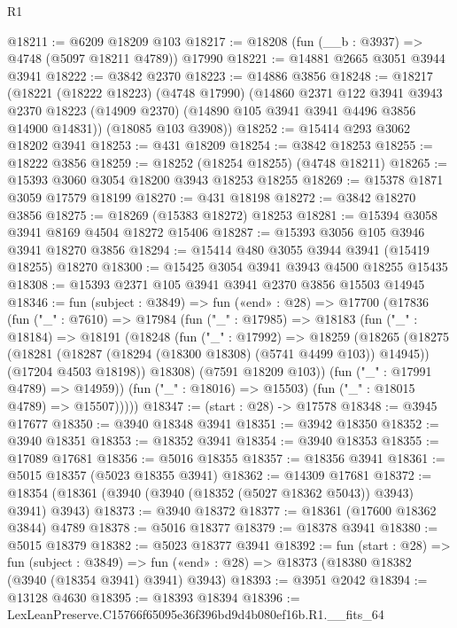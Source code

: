 \begin{lexlean}{R1}
\begin{coremodule}
@18211 := @6209 @18209 @103
@18217 := @18208 (fun (__b : @3937) => @4748 (@5097 @18211 @4789)) @17990
@18221 := @14881 @2665 @3051 @3944 @3941
@18222 := @3842 @2370
@18223 := @14886 @3856
@18248 := @18217
    (@18221
      (@18222 @18223)
      (@4748 @17990)
      (@14860
        @2371
        @122
        @3941
        @3943
        @2370
        @18223
        (@14909 @2370)
        (@14890 @105 @3941 @3941 @4496 @3856 @14900 @14831))
      (@18085 @103 @3908))
@18252 := @15414 @293 @3062 @18202 @3941
@18253 := @431 @18209
@18254 := @3842 @18253
@18255 := @18222 @3856
@18259 := @18252 (@18254 @18255) (@4748 @18211)
@18265 := @15393 @3060 @3054 @18200 @3943 @18253 @18255
@18269 := @15378 @1871 @3059 @17579 @18199
@18270 := @431 @18198
@18272 := @3842 @18270 @3856
@18275 := @18269 (@15383 @18272) @18253
@18281 := @15394 @3058 @3941 @8169 @4504 @18272 @15406
@18287 := @15393 @3056 @105 @3946 @3941 @18270 @3856
@18294 := @15414 @480 @3055 @3944 @3941 (@15419 @18255) @18270
@18300 := @15425 @3054 @3941 @3943 @4500 @18255 @15435
@18308 := @15393 @2371 @105 @3941 @3941 @2370 @3856 @15503 @14945
@18346 := fun (subject : @3849) =>
  fun («end» : @28) =>
  @17700
    (@17836
      (fun ("_" : @7610) =>
      @17984
        (fun ("_" : @17985) =>
        @18183
          (fun ("_" : @18184) =>
          @18191
            (@18248
              (fun ("_" : @17992) =>
              @18259
                (@18265
                  (@18275
                    (@18281 (@18287 (@18294 (@18300 @18308) (@5741 @4499 @103)) @14945))
                    (@17204 @4503 @18198))
                  @18308)
                (@7591 @18209 @103))
              (fun ("_" : @17991 @4789) => @14959))
            (fun ("_" : @18016) => @15503)
            (fun ("_" : @18015 @4789) => @15507)))))
@18347 := (start : @28) -> @17578
@18348 := @3945 @17677
@18350 := @3940 @18348 @3941
@18351 := @3942 @18350
@18352 := @3940 @18351
@18353 := @18352 @3941
@18354 := @3940 @18353
@18355 := @17089 @17681
@18356 := @5016 @18355
@18357 := @18356 @3941
@18361 := @5015 @18357 (@5023 @18355 @3941)
@18362 := @14309 @17681
@18372 := @18354 (@18361 (@3940 (@3940 (@18352 (@5027 @18362 @5043)) @3943) @3941) @3943)
@18373 := @3940 @18372
@18377 := @18361 (@17600 @18362 @3844) @4789
@18378 := @5016 @18377
@18379 := @18378 @3941
@18380 := @5015 @18379
@18382 := @5023 @18377 @3941
@18392 := fun (start : @28) =>
  fun (subject : @3849) =>
  fun («end» : @28) => @18373 (@18380 @18382 (@3940 (@18354 @3941) @3941) @3943)
@18393 := @3951 @2042
@18394 := @13128 @4630
@18395 := @18393 @18394
@18396 := LexLeanPreserve.C15766f65095e36f396bd9d4b080ef16b.R1.__fits_64

\end{coremodule}
\end{lexlean}
